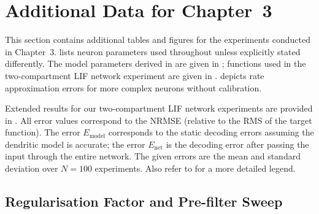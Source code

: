 
\section{Additional Data for Chapter~3}
\label{app:data_chp3}

This section contains additional tables and figures for the experiments conducted in Chapter~3.
 lists neuron parameters used throughout  unless explicitly stated differently.
The model parameters derived in  are given in ; functions used in the two-compartment LIF network experiment are given in .
 depicts rate approximation errors for more complex \nlif neurons without calibration.







Extended results for our two-compartment LIF network experiments are provided in .
All error values correspond to the NRMSE (relative to the RMS of the target function).
The error $E_\mathrm{model}$ corresponds to the static decoding errors assuming the dendritic model is accurate;
the error $E_\mathrm{net}$ is the decoding error after passing the input through the entire network.
The given errors are the mean and standard deviation over $N = 100$ experiments.
Also refer to  for a more detailed legend.



\subsection{Regularisation Factor and Pre-filter Sweep}
\label{app:two_comp_regularisation_factor_sweep}

